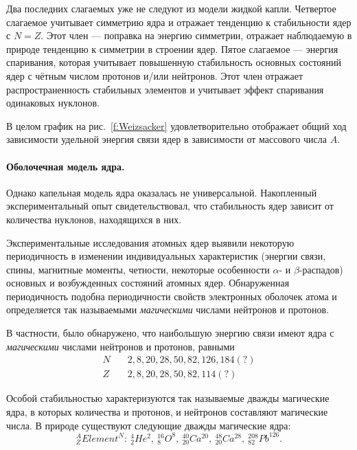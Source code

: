 \documentclass[a5paper,openany]{book}
\begin{document}
	
	Два последних слагаемых  уже не следуют из модели жидкой капли. 
	Четвертое слагаемое учитывает симметрию ядра и отражает тенденцию к стабильности ядер с $N=Z$. Этот член --- поправка на энергию симметрии, отражает наблюдаемую в природе тенденцию к симметрии в строении ядер. Пятое слагаемое --- энергия спаривания, которая учитывает повышенную стабильность основных состояний ядер с чётным числом протонов и/или  нейтронов. Этот член отражает распространенность стабильных элементов и учитывает эффект спаривания одинаковых нуклонов. 
	
	В целом график на рис.~\ref{f:Weizsacker} удовлетворительно отображает общий ход зависимости 
	удельной энергия связи ядер в зависимости от массового числа $A$.
	
	\paragraph{Оболочечная модель ядра.} \label{ShellNucleiModel}
	Однако капельная модель ядра оказалась не универсальной. Накопленный экспериментальный опыт свидетельствовал, что стабильность ядер зависит от количества нуклонов, находящихся в них. 
	
	Экспериментальные исследования атомных ядер выявили некоторую периодичность в изменении
	индивидуальных характеристик (энергии связи, спины, магнитные моменты, четности, некоторые особенности $\alpha$- и $\beta$-распадов) основных и возбужденных состояний атомных ядер. 
	Обнаруженная периодичность подобна периодичности свойств электронных оболочек атома и определяется так называемыми \emph{магическими} числами нейтронов и протонов. 
	
	В частности, было обнаружено, что наибольшую энергию связи имеют ядра с \emph{магическими} числами нейтронов и протонов, равными 
	\begin{align}
	N & \quad 2, 8, 20, 28, 50, 82, 126, 184(?) \label{MagicN} \\
	Z & \quad 2, 8, 20, 28, 50, 82, 114(?) \label{MagicP}
	\end{align}
	
		Особой стабильностью характеризуются так называемые дважды магические ядра, в которых количества и протонов, и нейтронов составляют магические числа. В природе существуют следующие дважды магические ядра: 
	\begin{equation*}
	^A_Z Element ^N :  \ ^4_2He^2, \ ^{16}_8O^8, \ ^{40}_{20}Ca^{20}, \ ^{48}_{20}Ca^{28}, \ ^{208}_{82}Pb^{126}.
	\end{equation*}
	
\end{document}
